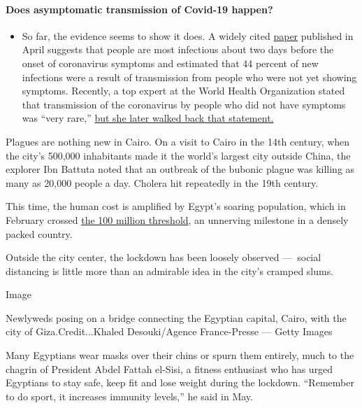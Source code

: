 \begin{itemize}
{  \paragraph{Does asymptomatic transmission of Covid-19
  happen?}\label{does-asymptomatic-transmission-of-covid-19-happen}}

  \begin{itemize}
  \tightlist
  \item
    So far, the evidence seems to show it does. A widely cited
    \href{https://www.nature.com/articles/s41591-020-0869-5}{paper}
    published in April suggests that people are most infectious about
    two days before the onset of coronavirus symptoms and estimated that
    44 percent of new infections were a result of transmission from
    people who were not yet showing symptoms. Recently, a top expert at
    the World Health Organization stated that transmission of the
    coronavirus by people who did not have symptoms was ``very rare,''
    \href{https://www.nytimes3xbfgragh.onion/2020/06/09/world/coronavirus-updates.html?action=click\&pgtype=Article\&state=default\&region=MAIN_CONTENT_3\&context=storylines_faq\#link-1f302e21}{but
    she later walked back that statement.}
  \end{itemize}
\end{itemize}

Plagues are nothing new in Cairo. On a visit to Cairo in the 14th
century, when the city's 500,000 inhabitants made it the world's largest
city outside China, the explorer Ibn Battuta noted that an outbreak of
the bubonic plague was killing as many as 20,000 people a day. Cholera
hit repeatedly in the 19th century.

This time, the human cost is amplified by Egypt's soaring population,
which in February crossed
\href{https://www.nytimes3xbfgragh.onion/2020/02/11/world/middleeast/egypt-population-100-million.html}{the
100 million threshold}, an unnerving milestone in a densely packed
country.

Outside the city center, the lockdown has been loosely observed
---~social distancing is little more than an admirable idea in the
city's cramped slums.

Image

Newlyweds posing on a bridge connecting the Egyptian capital, Cairo,
with the city of Giza.Credit...Khaled Desouki/Agence France-Presse ---
Getty Images

Many Egyptians wear masks over their chins or spurn them entirely, much
to the chagrin of President Abdel Fattah el-Sisi, a fitness enthusiast
who has urged Egyptians to stay safe, keep fit and lose weight during
the lockdown. ``Remember to do sport, it increases immunity levels,'' he
said in May.

